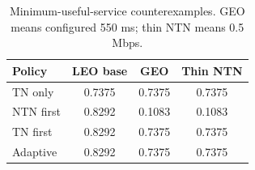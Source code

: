 \begin{table}[t]
\centering
\caption{Minimum-useful-service counterexamples. GEO means configured 550 ms; thin NTN means 0.5 Mbps.}
\label{tab:negative}
\par\smallskip
\footnotesize
\begin{tabular}{lccc}\toprule
Policy & LEO base & GEO & Thin NTN \\ \midrule
TN only & 0.7375 & 0.7375 & 0.7375 \\
NTN first & 0.8292 & 0.1083 & 0.1083 \\
TN first & 0.8292 & 0.7375 & 0.7375 \\
Adaptive & 0.8292 & 0.7375 & 0.7375 \\
\bottomrule\end{tabular}
\end{table}
